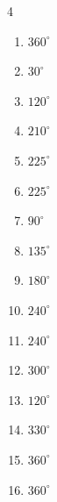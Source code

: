 \begin{multicols}{4}
\begin{enumerate}
  \item $\displaystyle 360^{\circ}$
        \phantom{$\displaystyle =2\pi$}

  \item $\displaystyle 30^{\circ}$

  \item $\displaystyle 120^{\circ}$

  \item $\displaystyle 210^{\circ}$

  \item $\displaystyle 225^{\circ}$

  \item $\displaystyle 225^{\circ}$

  \item $\displaystyle 90^{\circ}$

  \item $\displaystyle 135^{\circ}$

  \item $\displaystyle 180^{\circ}$
        \phantom{$\displaystyle =\pi$}

  \item $\displaystyle 240^{\circ}$

  \item $\displaystyle 240^{\circ}$

  \item $\displaystyle 300^{\circ}$

  \item $\displaystyle 120^{\circ}$

  \item $\displaystyle 330^{\circ}$

  \item $\displaystyle 360^{\circ}$
        \phantom{$\displaystyle =2\pi$}

  \item $\displaystyle 360^{\circ}$
        \phantom{$\displaystyle =2\pi$}


\end{enumerate}
\end{multicols}
